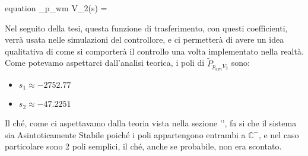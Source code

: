 \begin{Large}
	\begin{empheq}[box=\mathResult]{equation} \label{eq:StimaModelloInOut}
		_{p_{wm} V_2}(s) = 
	\end{empheq}
\end{Large}

\noindent
Nel seguito della tesi, questa funzione di trasferimento, con questi coefficienti, verrà usata nelle simulazioni del controllore, e ci permetterà di avere un idea qualitativa di come si comporterà il controllo una volta implementato nella realtà.\\
Come potevamo aspettarci dall'analisi teorica, i poli di $ \tilde{P}_{p_{wm} V_2} $ sono:
\begin{itemize}
	\item $ s_1\approx-2752.77 $
	\item $ s_2\approx-47.2251 $
\end{itemize}
\noindent
Il ché, come ci aspettavamo dalla teoria vista nella sezione '', fa si che il sistema sia Asintoticamente Stabile poiché i poli appartengono entrambi a $ \mathbb{C}^- $, e nel caso particolare sono 2 poli semplici, il ché, anche se probabile, non era scontato.





